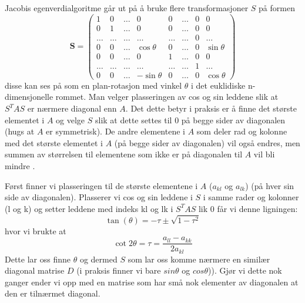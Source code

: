 \documentclass[reprint,english,notitlepage]{revtex4-1}
\begin{document}
	Jacobis egenverdialgoritme går ut på å bruke flere transformasjoner $S$ på formen
	\begin{equation*}
	\mathbf{S}=
	\left( 
	\begin{array}{cccccccc}
		1  &    0  & \dots &   0        &    0  & \dots & 0 &   0       \\
		0  &    1  & \dots &   0        &    0  & \dots & 0 &   0       \\
		\dots & \dots & \dots & \dots      & \dots & \dots & 0 & \dots     \\ 
		0  &    0  & \dots & \cos\theta  &    0  & \dots & 0 & \sin\theta \\
		0  &    0  & \dots &   0        &    1  & \dots & 0 &   0       \\
		\dots & \dots & \dots & \dots      & \dots & \dots & 1 & \dots     \\
		0  &    0  & \dots &  -\sin\theta        &    0  & \dots & 0 &   \cos\theta   
	\end{array}
	\right)
	\end{equation*}
	disse kan ses på som en plan-rotasjon med vinkel $\theta$ i det euklidiske n-dimensjonelle rommet. Man velger plasseringen av cos og sin leddene slik at $S^T A S$ er nærmere diagonal enn $A$. Det dette betyr i praksis er å finne det største elementet i $A$ og velge $S$ slik at dette settes til 0 på begge sider av diagonalen (hugs at $A$ er symmetrisk). De andre elementene i $A$ som deler rad og kolonne med det største elementet i $A$ (på begge sider av diagonalen) vil også endres, men summen av størrelsen til elementene som ikke er på diagonalen til $A$ vil bli mindre \cite{eigvalEmne}.
	
	Først finner vi plasseringen til de største elementene i $A$ ($a_{kl}$ og $a_{lk}$) (på hver sin side av diagonalen). Plasserer vi cos og sin leddene i $S$ i samme rader og kolonner (l og k) og setter leddene med indeks kl og lk i $S^T A S$ lik 0 får vi denne ligningen:
	\begin{equation*}
	\tan(\theta) = -\tau \pm \sqrt{1 - \tau^2}
	\end{equation*}
	hvor vi brukte at
	\begin{equation*}
	\cot 2\theta= \tau = \frac{a_{ll}-a_{kk}}{2a_{kl}}
	\end{equation*}
	Dette lar oss finne $\theta$ og dermed $S$ som lar oss komme nærmere en similær diagonal matrise $D$ (i praksis finner vi bare $sin\theta$ og $cos\theta$)). Gjør vi dette nok ganger ender vi opp med en matrise som har små nok elementer av diagonalen at den er tilnærmet diagonal.
	
\end{document}
